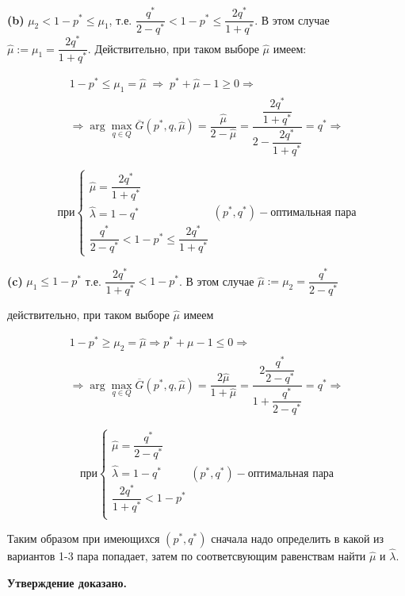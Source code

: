 \begin{flushleft}
\textbf{(b)}
$\mu_2 < 1-p^* \leqslant \mu_1$, т.е.  
$\dfrac{q^*}{2 - q^{*}} < 1 - p^* \leqslant \dfrac{2 q^*}{1 + q^*}$.
В этом случае $\hat \mu := \mu_1 = \dfrac{2 q^*}{1 + q^*}$.
Действительно, при таком выборе $\hat \mu$ имеем:

\begin{gather*}
	1 - p^* \leq \mu_1 = \hat \mu 
	\; \Rightarrow \;
	p^* + \hat \mu - 1 \geqslant 0 \Rightarrow 
	\\
	\Rightarrow  \arg \max \limits_{q \in Q} \overline G(p^*, q, \hat \mu) =
	\dfrac{\hat \mu}{2 - \hat \mu} =
	\dfrac{\dfrac{2 q^*}{1 + q^*}}{2 - \dfrac{2 q^*}{1 + q^*}}=
	q^* \Rightarrow
\end{gather*} 

$$
\textrm{при}
\begin{cases}
	\hat \mu = \dfrac{2 q^*}{1 + q^*} \\
	\hat \lambda = 1 - q^* \\
	\dfrac{q^*}{2 - q^*} < 1 - p^* \leqslant \dfrac{2 q^*}{1 + q^*}
\end{cases}
(p^*, q^*) - \textrm{оптимальная пара}
$$

\textbf{(c)} 
$\mu_1 \leqslant 1-p^*$ т.е. $\dfrac{2q^*}{1 + q^*} < 1 - p^*$.
В этом случае $\hat \mu := \mu_2 = \dfrac{q^*}{2 - q^*}$ 

действительно, при таком выборе $\hat \mu$ имеем 

\begin{gather*}
	1 - p^* \geqslant \mu_2 = \hat \mu \Rightarrow
	p^*+\mu-1 \leqslant 0 \Rightarrow 
	\\	
	\Rightarrow \arg \max \limits_{q \in Q} \overline G(p^*, q, \hat \mu) =
	\dfrac{2 \hat \mu}{1 + \hat \mu} =
	\dfrac{2 \dfrac{q^*}{2 - q^*}}{1 + \dfrac{q^*}{2 - q^*}} =
	q^* \Rightarrow
\end{gather*}
 
$$
\textrm{при}
\begin{cases}
	\hat\mu=\dfrac{q^{*}}{2-q^{*}} \\
	\hat\lambda = 1 - q^{*} \\
	\dfrac{2q^{*}}{1+q^{*}} < 1-p^{*} \\
\end{cases}
(p^*, q^*) - \textrm{оптимальная пара}
$$
 
\end{flushleft}


Таким образом при имеющихся $(p^{*},q^{*})$ сначала надо определить в какой из вариантов 1-3 пара попадает, затем
по соответсвующим равенствам найти $\hat\mu$ и $\hat\lambda$.

\textbf{Утверждение доказано.}
